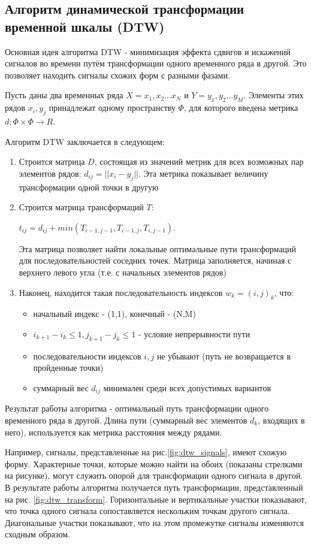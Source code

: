 \subsection{Алгоритм динамической трансформации временной шкалы (DTW)}

Основная идея алгоритма DTW - минимизация эффекта сдвигов и искажений сигналов во времени путём трансформации одного временного ряда в другой. Это позволяет находить сигналы схожих форм с разными фазами\cite{dtw_review}. 

Пусть даны два временных ряда $X=x_1,x_2...x_N$ и $Y=y_1,y_2...y_M$. Элементы этих рядов $x_i,y_j$ принадлежат одному пространству $\Phi$, для которого введена метрика $d: \Phi \times \Phi \to R$. 

Алгоритм DTW заключается в следующем:

\begin{enumerate}
\item Строится матрица $D$, состоящая из значений метрик для всех возможных пар элементов рядов: $d_{ij}=|| x_i-y_j ||$. Эта метрика показывает величину трансформации одной точки в другую
\item Строится матрица трансформаций $T$:

$t_{ij}=d_{ij}+min(T_{i-1,j-1},T_{i-1,j},T_{i,j-1})$. 

Эта матрица позволяет найти локальные оптимальные пути трансформаций для последовательностей соседних точек. Матрица заполняется, начиная с верхнего левого угла (т.е. с начальных элементов рядов)
\item Наконец, находится такая последовательность индексов $w_k=(i,j)_k$, что:
  \begin{itemize}
  \item начальный индекс - (1,1), конечный - (N,M)
  \item $i_{k+1}-i_k \leq 1, j_{k+1}-j_k \leq 1$ - условие непрерывности пути
  \item последовательности индексов $i, j$ не убывают (путь не возвращается в пройденные точки)
  \item суммарный вес $d_{ij}$ минимален среди всех допустимых вариантов
  \end{itemize}
\end{enumerate}

Результат работы алгоритма - оптимальный путь трансформации одного временного ряда в другой. Длина пути (суммарный вес элементов $d_k$, входящих в него), используется как метрика расстояния между рядами. 

Например, сигналы, представленные на рис.\ref{fig:dtw_signals}\cite{dtw_review}, имеют схожую форму. Характерные точки, которые можно найти на обоих (показаны стрелками на рисунке), могут служить опорой для трансформации одного сигнала в другой. В результате работы алгоритма получается путь трансформации, представленный на рис. \ref{fig:dtw_transform}\cite{dtw_review}. Горизонтальные и вертикальные участки показывают, что точка одного сигнала сопоставляется нескольким точкам другого сигнала. Диагональные участки показывают, что на этом промежутке сигналы изменяются сходным образом.

